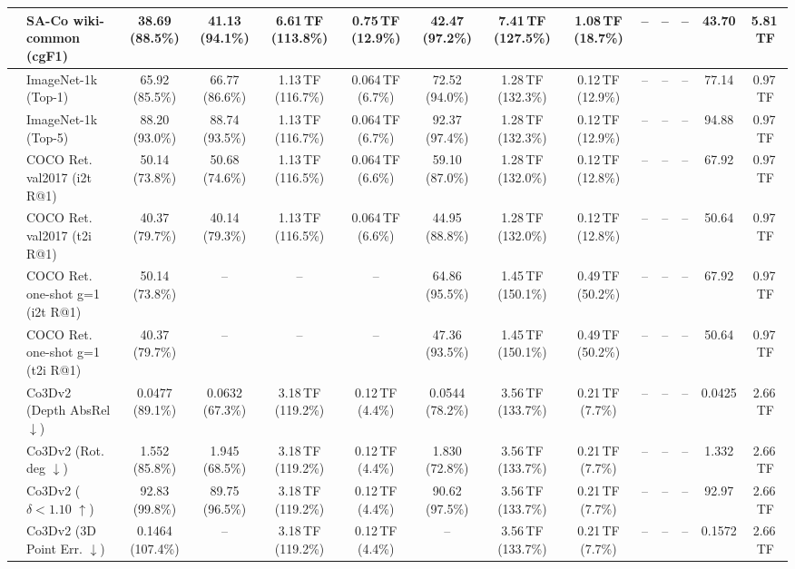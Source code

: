 \begin{table}[t]
\begin{center}
\begin{small}
\begin{sc}
{\begin{tabular}{llcccccccccccc}
& SA-Co wiki-common (cgF1) & 38.69 (88.5\%) & 41.13 (94.1\%) & 6.61\,TF (113.8\%) & 0.75\,TF (12.9\%) & 42.47 (97.2\%) & 7.41\,TF (127.5\%) & 1.08\,TF (18.7\%) & -- & -- & -- & 43.70 & 5.81\,TF \\
\midrule
{}
& ImageNet-1k (Top-1) & 65.92 (85.5\%) & 66.77 (86.6\%) & 1.13\,TF (116.7\%) & 0.064\,TF (6.7\%) & 72.52 (94.0\%) & 1.28\,TF (132.3\%) & 0.12\,TF (12.9\%) & -- & -- & -- & 77.14 & 0.97\,TF \\
& ImageNet-1k (Top-5) & 88.20 (93.0\%) & 88.74 (93.5\%) & 1.13\,TF (116.7\%) & 0.064\,TF (6.7\%) & 92.37 (97.4\%) & 1.28\,TF (132.3\%) & 0.12\,TF (12.9\%) & -- & -- & -- & 94.88 & 0.97\,TF \\
& COCO Ret. val2017 (i2t R@1) & 50.14 (73.8\%) & 50.68 (74.6\%) & 1.13\,TF (116.5\%) & 0.064\,TF (6.6\%) & 59.10 (87.0\%) & 1.28\,TF (132.0\%) & 0.12\,TF (12.8\%) & -- & -- & -- & 67.92 & 0.97\,TF \\
& COCO Ret. val2017 (t2i R@1) & 40.37 (79.7\%) & 40.14 (79.3\%) & 1.13\,TF (116.5\%) & 0.064\,TF (6.6\%) & 44.95 (88.8\%) & 1.28\,TF (132.0\%) & 0.12\,TF (12.8\%) & -- & -- & -- & 50.64 & 0.97\,TF \\
& COCO Ret. one-shot g=1 (i2t R@1) & 50.14 (73.8\%) & -- & -- & -- & 64.86 (95.5\%) & 1.45\,TF (150.1\%) & 0.49\,TF (50.2\%) & -- & -- & -- & 67.92 & 0.97\,TF \\
& COCO Ret. one-shot g=1 (t2i R@1) & 40.37 (79.7\%) & -- & -- & -- & 47.36 (93.5\%) & 1.45\,TF (150.1\%) & 0.49\,TF (50.2\%) & -- & -- & -- & 50.64 & 0.97\,TF \\
\midrule
{}
& Co3Dv2 (Depth AbsRel $\downarrow$) & 0.0477 (89.1\%) & 0.0632 (67.3\%) & 3.18\,TF (119.2\%) & 0.12\,TF (4.4\%) & 0.0544 (78.2\%) & 3.56\,TF (133.7\%) & 0.21\,TF (7.7\%) & -- & -- & -- & 0.0425 & 2.66\,TF \\
& Co3Dv2 (Rot. deg $\downarrow$) & 1.552 (85.8\%) & 1.945 (68.5\%) & 3.18\,TF (119.2\%) & 0.12\,TF (4.4\%) & 1.830 (72.8\%) & 3.56\,TF (133.7\%) & 0.21\,TF (7.7\%) & -- & -- & -- & 1.332 & 2.66\,TF \\
& Co3Dv2 ($\delta < 1.10$ $\uparrow$) & 92.83 (99.8\%) & 89.75 (96.5\%) & 3.18\,TF (119.2\%) & 0.12\,TF (4.4\%) & 90.62 (97.5\%) & 3.56\,TF (133.7\%) & 0.21\,TF (7.7\%) & -- & -- & -- & 92.97 & 2.66\,TF \\
& Co3Dv2 (3D Point Err. $\downarrow$) & 0.1464 (107.4\%) & -- & 3.18\,TF (119.2\%) & 0.12\,TF (4.4\%) & -- & 3.56\,TF (133.7\%) & 0.21\,TF (7.7\%) & -- & -- & -- & 0.1572 & 2.66\,TF \\

\end{tabular}}
\end{sc}
\end{small}
\end{center}
\end{table}
